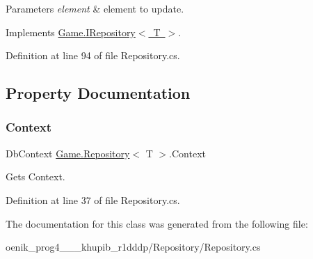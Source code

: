 \begin{DoxyParams}{Parameters}
{\em element} & element to update.\\
\hline
\end{DoxyParams}


Implements \mbox{\hyperlink{interface_game_1_1_i_repository_a5482bc216e74fc42127e933df0e433c2}{Game.\+I\+Repository$<$ T $>$}}.



Definition at line 94 of file Repository.\+cs.



\subsection{Property Documentation}
\mbox{\label{class_game_1_1_repository_a3cc410e05f93e5ccfb3fb3430b2898cb}} 
\subsubsection{\texorpdfstring{Context}{Context}}
{\footnotesize\ttfamily Db\+Context \mbox{\hyperlink{class_game_1_1_repository}{Game.\+Repository}}$<$ T $>$.Context\hspace{0.3cm}{\ttfamily [get]}}



Gets Context. 



Definition at line 37 of file Repository.\+cs.



The documentation for this class was generated from the following file\+:\begin{DoxyCompactItemize}
\item 
oenik\+\_\+prog4\+\_\+\_\+\_\+khupib\+\_\+r1dddp/\+Repository/Repository.\+cs\end{DoxyCompactItemize}
